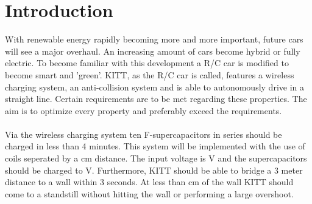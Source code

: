 \documentclass[final]{scrreprt} %
\begin{document}
\chapter{Introduction}
With renewable energy rapidly becoming more and more important, future cars will see a major overhaul. 
An increasing amount of cars become hybrid or fully electric. 
To become familiar with this development a R/C car is modified to become smart and 'green'.
KITT, as the R/C car is called, features a wireless charging system, an anti-collision system and is able to autonomously drive in a straight line. 
Certain requirements are to be met regarding these properties. 
The aim is to optimize every property and preferably exceed the requirements.
\\\\
Via the wireless charging system ten \unit[350]{F}-supercapacitors in series should be charged in less than 4 minutes. 
This system will be implemented with the use of coils seperated by a \unit[6]{cm} distance. 
The input voltage is \unit[18]{V} and the supercapacitors should be charged to \unit[20]{V}. 
Furthermore, KITT should be able to bridge a 3 meter distance to a wall within 3 seconds. 
At less than \unit[10]{cm} of the wall KITT should come to a standstill without hitting the wall or performing a large overshoot.
\end{document}
